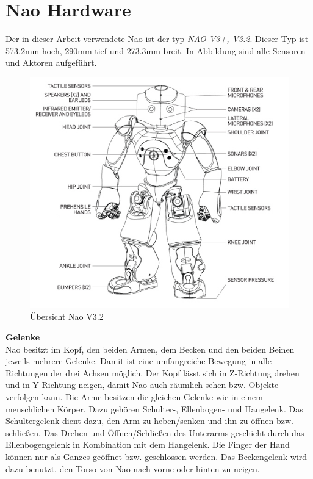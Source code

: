 \section{Nao Hardware}
Der in dieser Arbeit verwendete Nao ist der typ \textit{NAO V3+, V3.2}. Dieser Typ ist 573.2mm hoch, 290mm tief und 273.3mm breit. In Abbildung  sind alle Sensoren und Aktoren aufgeführt.
\\
\begin{figure}[H]						
	\centering							
	\includegraphics[scale=0.9]{Bilder/nao_overview.jpg}			
	\caption{Übersicht Nao V3.2}						
	\label{f:nao_ov}						
\end{figure}
\noindent
\textbf{Gelenke}
\\
Nao besitzt  im Kopf, den beiden Armen, dem Becken und den beiden Beinen jeweils mehrere Gelenke. Damit ist eine umfangreiche Bewegung in alle Richtungen der drei Achsen möglich. Der Kopf lässt sich in Z-Richtung drehen und in Y-Richtung neigen, damit Nao auch räumlich sehen bzw. Objekte verfolgen kann.
Die Arme besitzen die gleichen Gelenke wie in einem menschlichen Körper. Dazu gehören Schulter-, Ellenbogen- und Hangelenk. Das Schultergelenk dient dazu, den Arm zu heben/senken und ihn zu öffnen bzw. schließen. Das Drehen und Öffnen/Schließen des Unterarms geschieht durch das Ellenbogengelenk in Kombination mit dem Hangelenk. Die Finger der Hand können nur als Ganzes geöffnet bzw. geschlossen werden.
Das Beckengelenk wird dazu benutzt, den Torso von Nao nach vorne oder hinten zu neigen.
